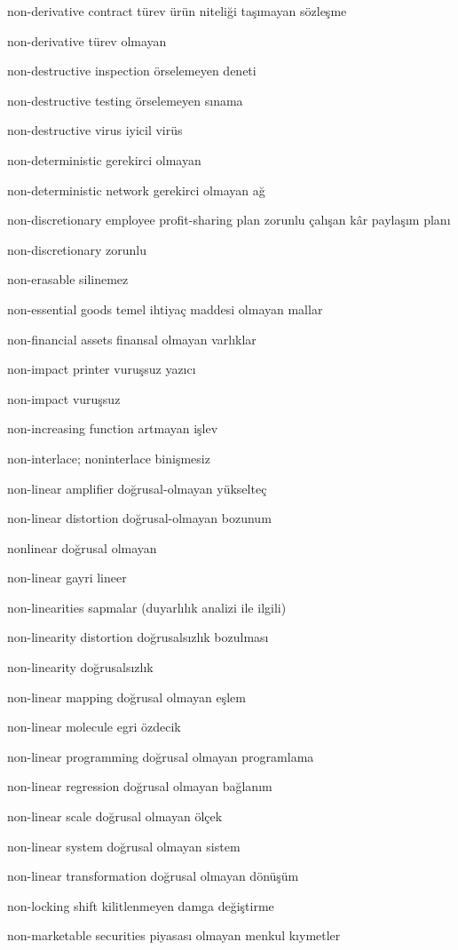 \documentclass[12pt,fleqn]{article}\usepackage{../../common}
\begin{document}
non-derivative contract türev ürün niteliği taşımayan sözleşme

non-derivative türev olmayan

non-destructive inspection örselemeyen deneti

non-destructive testing örselemeyen sınama

non-destructive virus iyicil virüs

non-deterministic gerekirci olmayan

non-deterministic network gerekirci olmayan ağ

non-discretionary employee profit-sharing plan zorunlu çalışan kâr paylaşım planı

non-discretionary zorunlu

non-erasable silinemez

non-essential goods temel ihtiyaç maddesi olmayan mallar

non-financial assets finansal olmayan varlıklar

non-impact printer vuruşsuz yazıcı

non-impact vuruşsuz

non-increasing function artmayan işlev

non-interlace; noninterlace binişmesiz

non-linear amplifier doğrusal-olmayan yükselteç

non-linear distortion doğrusal-olmayan bozunum

nonlinear doğrusal olmayan

non-linear gayri lineer

non-linearities sapmalar (duyarlılık analizi ile ilgili)

non-linearity distortion doğrusalsızlık bozulması

non-linearity doğrusalsızlık

non-linear mapping doğrusal olmayan eşlem

non-linear molecule egri özdecik

non-linear programming doğrusal olmayan programlama

non-linear regression doğrusal olmayan bağlanım

non-linear scale doğrusal olmayan ölçek

non-linear system doğrusal olmayan sistem

non-linear transformation doğrusal olmayan dönüşüm

non-locking shift kilitlenmeyen damga değiştirme

non-marketable securities piyasası olmayan menkul kıymetler
\end{document}
